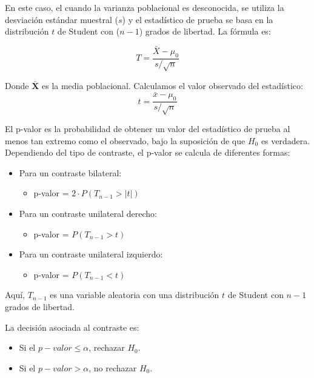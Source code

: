 \documentclass[
  letterpaper,
  DIV=11,
  numbers=noendperiod]{scrreprt}
\providecommand{\tightlist}{%
  \setlength{\itemsep}{0pt}\setlength{\parskip}{0pt}}\usepackage{longtable,booktabs,array}
\begin{document}
En este caso, el cuando la varianza poblacional es desconocida, se
utiliza la desviación estándar muestral (\(s\)) y el estadístico de
prueba se basa en la distribución \(t\) de Student con (\(n - 1\))
grados de libertad. La fórmula es:

\[ T=\frac{\bar{X} - \mu_0}{s/\sqrt{n}} \]

Donde \(\bar{\mathbf{X}}\) es la media poblacional. Calculamos el valor
observado del estadístico: \[ t = \frac{\bar{x} - \mu_0}{s/\sqrt{n}}  \]

El p-valor es la probabilidad de obtener un valor del estadístico de
prueba al menos tan extremo como el observado, bajo la suposición de que
\(H_0\) es verdadera. Dependiendo del tipo de contraste, el p-valor se
calcula de diferentes formas:

\begin{itemize}
\tightlist
\item
  Para un contraste bilateral:

  \begin{itemize}
  \tightlist
  \item
    p-valor = \(2 \cdot P(T_{n-1} > |t|)\)
  \end{itemize}
\item
  Para un contraste unilateral derecho:

  \begin{itemize}
  \tightlist
  \item
    p-valor = \(P(T_{n-1} > t)\)
  \end{itemize}
\item
  Para un contraste unilateral izquierdo:

  \begin{itemize}
  \tightlist
  \item
    p-valor = \(P(T_{n-1} < t)\)
  \end{itemize}
\end{itemize}

Aquí, \(T_{n-1}\) es una variable aleatoria con una distribución \(t\)
de Student con \(n - 1\) grados de libertad.

La decisión asociada al contraste es:

\begin{itemize}
\tightlist
\item
  Si el \(p-valor \leq \alpha\), rechazar \(H_0\).
\item
  Si el \(p-valor > \alpha\), no rechazar \(H_0\).
\end{itemize}
\end{document}
